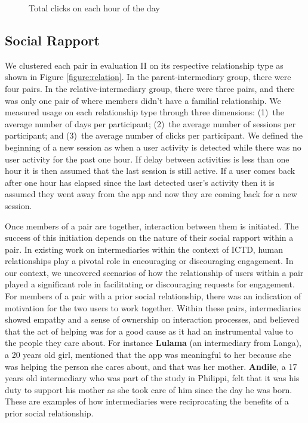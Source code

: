 \documentclass{sig-alternate}
\begin{document}
\begin{figure}
\centering
{}
\caption{Total clicks on each hour of the day}
\label{figure:hourpattern}
\end{figure}


\subsection{Social Rapport}

We clustered each pair in evaluation II on its respective relationship type as
shown in Figure \ref{figure:relation}. In the parent-intermediary group, there
were four pairs. In the relative-intermediary group, there were three pairs,
and there was only one pair of where members didn't have a familial
relationship. We measured usage on each relationship type through three
dimensions: (1)~the average number of days per participant; (2)~the
average number of sessions per participant; and (3)~the average number of clicks
per participant. We defined the beginning of a new session as when a user
activity is detected while there was no user activity for the past one hour.
If delay between activities is less than one hour it is then assumed that the
last session is still active. If a user comes back after one hour has elapsed
since the last detected user's activity then it is assumed they went away from
the app and now they are coming back for a new session.

Once members of a pair are together, interaction between them is initiated.
The success of this initiation depends on the nature of their social rapport
within a pair. In existing work on intermediaries within the context of ICTD,
human relationships play a pivotal role in encouraging or discouraging
engagement. In our context, we uncovered scenarios of how the relationship of
users within a pair played a significant role in facilitating or discouraging
requests for engagement. For members of a pair with a prior social
relationship, there was an indication of motivation for the two users to work
together. Within these pairs, intermediaries showed empathy and a sense of
ownership on interaction processes, and believed that the act of helping was
for a good cause as it had an instrumental value to the people they care
about. For instance \textbf{Lulama} (an intermediary from Langa), a 20 years
old girl, mentioned that the app was meaningful to her because she was helping
the person she cares about, and that was her mother. \textbf{Andile}, a 17
years old intermediary who was part of the study in Philippi, felt that it was
his duty to support his mother as she took care of him since the day he was
born. These are examples of how intermediaries were reciprocating the benefits
of a prior social relationship.
\end{document}
